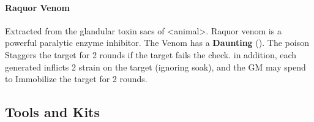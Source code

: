 \begin{multicols}{2}
\paragraph{Raquor Venom} \label{poison:raquor}
Extracted from the glandular toxin sacs of <animal>. Raquor venom is a powerful
paralytic enzyme inhibitor. The Venom has a \textbf{Daunting} (\difficulty\difficulty\difficulty\difficulty).
The poison Staggers the target for 2 rounds if the target fails the check. in
addition, each \threat generated inflicts 2 strain on the target (ignoring soak),
and the GM may spend \despair to Immobilize the target for 2 rounds.

\end{multicols}
\hrulefill

\subsection{Tools and Kits}

